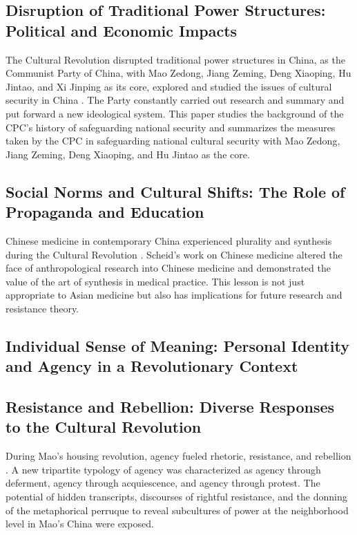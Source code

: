 \documentclass{article}
\begin{document}
\subsection{Disruption of Traditional Power Structures: Political and Economic Impacts}

The Cultural Revolution disrupted traditional power structures in China, as the Communist Party of China, with Mao Zedong, Jiang Zeming, Deng Xiaoping, Hu Jintao, and Xi Jinping as its core, explored and studied the issues of cultural security in China \cite{Weiqiang2019AnAO}. The Party constantly carried out research and summary and put forward a new ideological system. This paper studies the background of the CPC's history of safeguarding national security and summarizes the measures taken by the CPC in safeguarding national cultural security with Mao Zedong, Jiang Zeming, Deng Xiaoping, and Hu Jintao as the core.

\subsection{Social Norms and Cultural Shifts: The Role of Propaganda and Education}

Chinese medicine in contemporary China experienced plurality and synthesis during the Cultural Revolution \cite{Lo2005VolkerSC}. Scheid's work on Chinese medicine altered the face of anthropological research into Chinese medicine and demonstrated the value of the art of synthesis in medical practice. This lesson is not just appropriate to Asian medicine but also has implications for future research and resistance theory.

\subsection{Individual Sense of Meaning: Personal Identity and Agency in a Revolutionary Context}

\subsection{Resistance and Rebellion: Diverse Responses to the Cultural Revolution}

During Mao's housing revolution, agency fueled rhetoric, resistance, and rebellion \cite{Maye-Banbury2015RepertoiresOR}. A new tripartite typology of agency was characterized as agency through deferment, agency through acquiescence, and agency through protest. The potential of hidden transcripts, discourses of rightful resistance, and the donning of the metaphorical perruque to reveal subcultures of power at the neighborhood level in Mao's China were exposed.
\end{document}
